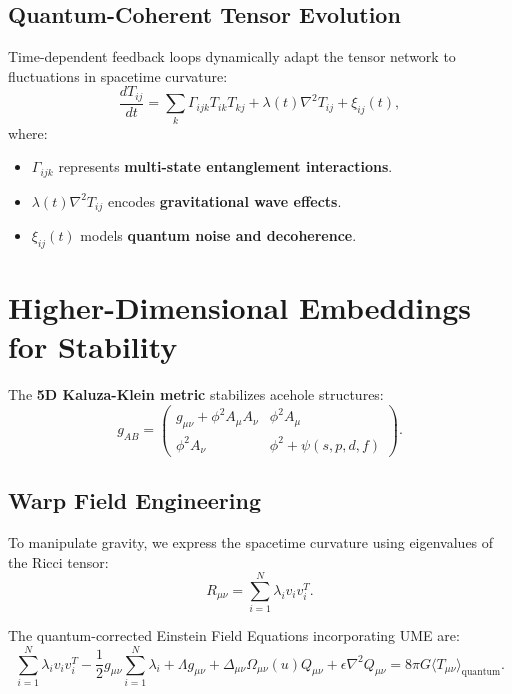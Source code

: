 \documentclass{article}
\theoremstyle{plain}
\begin{document}
\begin{itemize}
\begin{itemize}
\subsection{Quantum-Coherent Tensor Evolution}
Time-dependent feedback loops dynamically adapt the tensor network to fluctuations in spacetime curvature:
\begin{equation}
\frac{d T_{ij}}{dt} = \sum_{k} \Gamma_{ijk} T_{ik} T_{kj} + \lambda(t) \nabla^2 T_{ij} + \xi_{ij}(t),
\end{equation}
where:
\begin{itemize}
    \item $\Gamma_{ijk}$ represents \textbf{multi-state entanglement interactions}.
    \item $\lambda(t) \nabla^2 T_{ij}$ encodes \textbf{gravitational wave effects}.
    \item $\xi_{ij}(t)$ models \textbf{quantum noise and decoherence}.
\end{itemize}

\section{Higher-Dimensional Embeddings for Stability}
The \textbf{5D Kaluza-Klein metric} stabilizes acehole structures:
\begin{equation}
g_{AB} =
\begin{pmatrix}
g_{\mu\nu} + \phi^2 A_{\mu} A_{\nu} & \phi^2 A_{\mu} \\
\phi^2 A_{\nu} & \phi^2 + \psi(s, p, d, f)
\end{pmatrix}.
\end{equation}

\subsection{Warp Field Engineering}

To manipulate gravity, we express the spacetime curvature using eigenvalues of the Ricci tensor:
\begin{equation}
R_{\mu\nu} = \sum_{i=1}^{N} \lambda_i v_i v_i^T.
\end{equation}

The quantum-corrected Einstein Field Equations incorporating UME are:
\begin{equation}
\sum_{i=1}^{N} \lambda_i v_i v_i^T - \frac{1}{2} g_{\mu\nu} \sum_{i=1}^{N} \lambda_i + \Lambda g_{\mu\nu} + \Delta_{\mu\nu} \Omega_{\mu\nu} (u) Q_{\mu\nu} + \epsilon \nabla^2 Q_{\mu\nu} = 8 \pi G \langle T_{\mu\nu} \rangle_{\text{quantum}}.
\end{equation}


\end{itemize}
\end{itemize}
\end{document}
